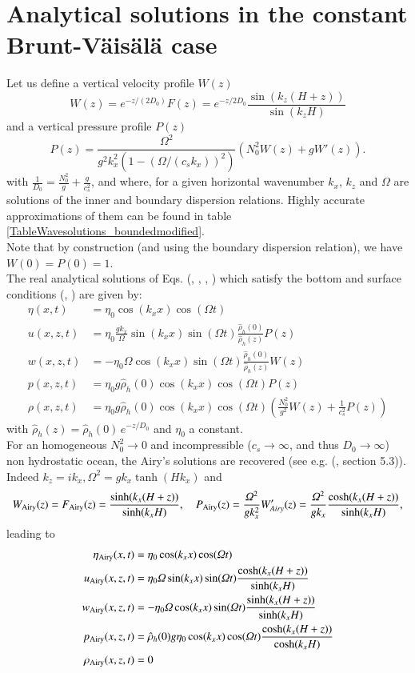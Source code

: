 \section{Analytical solutions in the constant Brunt-V\"ais\"al\"a case}
\label{solutionana}
Let us define a vertical velocity profile $W(z)$
\[
W(z)=e^{-z/(2D_0)}F(z)=e^{-z/2D_0}\frac{\sin(k_z(H+z))}{\sin (k_z H)}
\]
and a vertical pressure profile $P(z)$
\[
P(z)=\frac{\Omega^2}{g^2k_x^2(1-(\Omega/(c_sk_x))^2)} \left( N^2_0W(z)+gW'(z) \right).
\]
with $\displaystyle \frac{1}{D_0}=\frac{N^2_0}{g}+\frac{g}{c_s^2}$, and where, for a given horizontal wavenumber $k_x$, $k_z$ and $\Omega$ are solutions of the inner and boundary dispersion relations. Highly accurate approximations of them can be found in table \ref{TableWavesolutions_boundedmodified}.\\
Note that by construction (and using the boundary dispersion relation), we have $W(0)=P(0)=1$.\\
The real analytical solutions of Eqs. (, , , )
which satisfy the bottom and surface conditions (, )
are given by:
\begin{align}
\eta(x,t)&=\eta_0 \cos(k_x x)\cos(\Omega t)\\
u(x,z,t)&=\eta_0 \frac{gk_x}{\Omega}\sin(k_xx)\sin(\Omega t) \frac{\hat{\rho}_h(0)}{\hat{\rho}_h(z)} P(z)\\
w(x,z,t)&=-\eta_0 \Omega \cos(k_xx)\sin(\Omega t)\frac{\hat{\rho}_h(0)}{\hat{\rho}_h(z)}W(z)\\
p(x,z,t)&=\eta_0 g \hat{\rho}_h(0) \cos(k_xx)\cos(\Omega t) P(z)\\
\rho(x,z,t)&=\eta_0 g \hat{\rho}_h(0)
\cos(k_xx)\cos(\Omega t) \left(\frac{N^2_0}{g^2} W(z)+\frac{1}{c_s^2}P(z)
\right)
\end{align}
with $\hat{\rho}_h(z)=\hat{\rho}_h(0)\,e^{-z/D_0}$ and $\eta_0$ a constant.\\
For an homogeneous $N^2_0 \rightarrow 0$ and incompressible ($c_s \rightarrow \infty$, and thus $D_0\rightarrow \infty$) non hydrostatic ocean, the Airy's solutions are recovered (see e.g. (\citealt{gill_1982}, section 5.3)). Indeed $k_z=i k_x, \Omega^2=gk_x\tanh (Hk_x)$ and
\[
W_{\rm Airy}(z)=F_{\rm Airy}(z)=\frac{\sinh(k_x(H+z))}{\sinh (k_x H)},
\quad
P_{\rm Airy}(z)=\frac{\Omega^2}{gk_x^2} W_{Airy}'(z)=\frac{\Omega^2}{gk_x}\frac{\cosh(k_x(H+z))}{\sinh (k_x H)},
\]
leading to
\begin{align}
\eta_{\rm Airy}(x,t)&=\eta_0 \cos(k_x x)\cos(\Omega t)\\
u_{\rm Airy}(x,z,t)&=\eta_0 \Omega \sin(k_xx)\sin(\Omega t) \frac{\cosh(k_x(H+z))}{\sinh (k_x H)}\\
w_{\rm Airy}(x,z,t)&=-\eta_0 \Omega \cos(k_xx)\sin(\Omega t)\frac{\sinh(k_x(H+z))}{\sinh (k_x H)}\\
p_{\rm Airy}(x,z,t)&=\hat{\rho}_h(0) g \eta_0 \cos(k_xx)\cos(\Omega t) \frac{\cosh(k_x(H+z))}{\cosh (k_x H)}
\\
\rho_{\rm Airy}(x,z,t)&=0
\end{align}